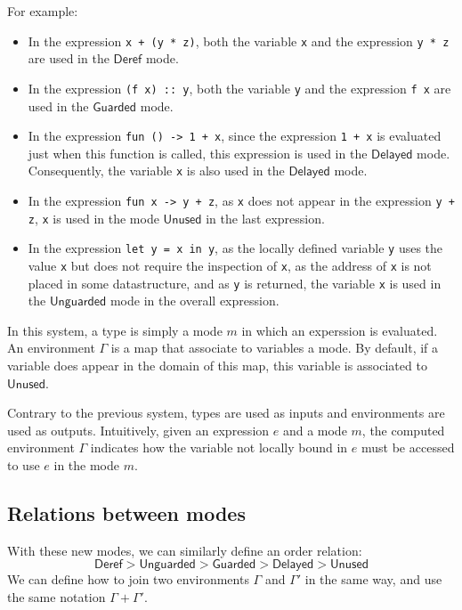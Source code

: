 \documentclass{article}
\newcommand{\Deref}{\mathsf{Deref}}
\newcommand{\Unguarded}{\mathsf{Unguarded}}
\newcommand{\Guarded}{\mathsf{Guarded}}
\newcommand{\Delayed}{\mathsf{Delayed}}
\newcommand{\Unused}{\mathsf{Unused}}
\begin{document}
For example:
\begin{itemize}
  \item In the expression \lstinline|x + (y * z)|, both the variable
    \lstinline|x| and the expression \lstinline|y * z| are used in the $\Deref$
    mode.
  \item In the expression \lstinline|(f x) :: y|, both the variable
    \lstinline|y| and the expression \lstinline|f x| are used in the $\Guarded$
    mode.
  \item In the expression \lstinline|fun () -> 1 + x|, since the expression
    \lstinline|1 + x| is evaluated just when this function is called, this
    expression is used in the $\Delayed$ mode. Consequently, the variable
    \lstinline|x| is also used in the $\Delayed$ mode.
  \item In the expression \lstinline|fun x -> y + z|, as \lstinline|x| does not
    appear in the expression \lstinline|y + z|, \lstinline|x| is used in the
    mode $\Unused$ in the last expression.
  \item In the expression \lstinline|let y = x in y|, as the locally defined
    variable \lstinline|y| uses the value \lstinline|x| but does not require the
    inspection of \lstinline|x|, as the address of \lstinline|x| is not placed
    in some datastructure, and as \lstinline|y| is returned, the variable
    \lstinline|x| is used in the $\Unguarded$ mode in the overall expression.

\end{itemize}

In this system, a type is simply a mode $m$ in which an experssion is
evaluated. An environment $\Gamma$ is a map that associate to variables a mode.
By default, if a variable does appear in the domain of this map, this variable
is associated to $\Unused$.

Contrary to the previous system, types are used as inputs and environments are
used as outputs. Intuitively, given an expression $e$ and a mode $m$, the
computed environment $\Gamma$ indicates how the variable not locally bound in
$e$ must be accessed to use $e$ in the mode $m$.

\subsection{Relations between modes}
With these new modes, we can similarly define an order relation:
$$\Deref > \Unguarded > \Guarded > \Delayed > \Unused$$
We can define how to join two environments $\Gamma$ and $\Gamma'$ in the same
way, and use the same notation $\Gamma + \Gamma'$.
\end{document}
